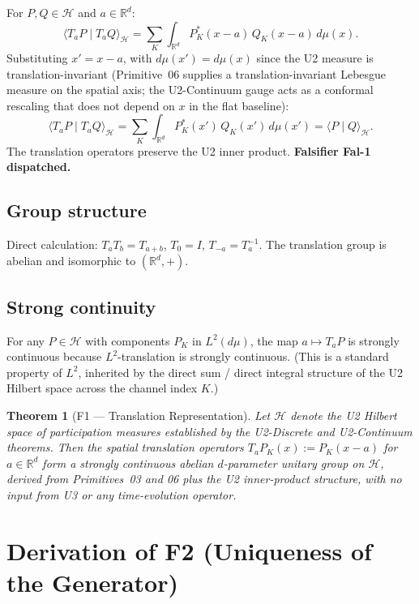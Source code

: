 \documentclass[11pt,a4paper]{article}
\newtheorem{theorem}{Theorem}[section]
\begin{document}
For $P, Q \in \mathcal{H}$ and $a \in \mathbb{R}^d$:
\[
\langle T_a P \mid T_a Q \rangle_{\mathcal{H}} = \sum_K \int_{\mathbb{R}^d} P_K^*(x - a) \, Q_K(x - a) \, d\mu(x).
\]
Substituting $x' = x - a$, with $d\mu(x') = d\mu(x)$ since the U2 measure is translation-invariant (Primitive~06 supplies a translation-invariant Lebesgue measure on the spatial axis; the U2-Continuum gauge acts as a conformal rescaling that does not depend on $x$ in the flat baseline):
\[
\langle T_a P \mid T_a Q \rangle_{\mathcal{H}} = \sum_K \int_{\mathbb{R}^d} P_K^*(x') \, Q_K(x') \, d\mu(x') = \langle P \mid Q \rangle_{\mathcal{H}}.
\]
The translation operators preserve the U2 inner product. \textbf{Falsifier Fal-1 dispatched.}

\subsection{Group structure}

Direct calculation: $T_a T_b = T_{a+b}$, $T_0 = I$, $T_{-a} = T_a^{-1}$. The translation group is abelian and isomorphic to $(\mathbb{R}^d, +)$.

\subsection{Strong continuity}

For any $P \in \mathcal{H}$ with components $P_K$ in $L^2(d\mu)$, the map $a \mapsto T_a P$ is strongly continuous because $L^2$-translation is strongly continuous. (This is a standard property of $L^2$, inherited by the direct sum / direct integral structure of the U2 Hilbert space across the channel index $K$.)

\begin{theorem}[F1 --- Translation Representation]
Let $\mathcal{H}$ denote the U2 Hilbert space of participation measures established by the U2-Discrete and U2-Continuum theorems. Then the spatial translation operators $T_a P_K(x) := P_K(x - a)$ for $a \in \mathbb{R}^d$ form a strongly continuous abelian $d$-parameter unitary group on $\mathcal{H}$, derived from Primitives~03 and 06 plus the U2 inner-product structure, with no input from U3 or any time-evolution operator.
\end{theorem}

\section{Derivation of F2 (Uniqueness of the Generator)}\label{sec:F2}
\end{document}
